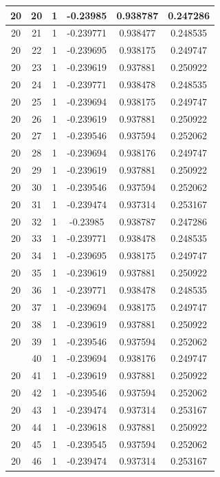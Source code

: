 \documentclass[12pt,a4paper]{article}
\numberwithin{equation}{section}
\numberwithin{figure}{section}
\numberwithin{table}{section}
\begin{document}
\begin{longtable}{|c|c|c|c|c|c|}
20 & 20 & 1 & -0.23985 & 0.938787 & 0.247286 \\ \hline
20 & 21 & 1 & -0.239771 & 0.938477 & 0.248535 \\ \hline
20 & 22 & 1 & -0.239695 & 0.938175 & 0.249747 \\ \hline
20 & 23 & 1 & -0.239619 & 0.937881 & 0.250922 \\ \hline
20 & 24 & 1 & -0.239771 & 0.938478 & 0.248535 \\ \hline
20 & 25 & 1 & -0.239694 & 0.938175 & 0.249747 \\ \hline
20 & 26 & 1 & -0.239619 & 0.937881 & 0.250922 \\ \hline
20 & 27 & 1 & -0.239546 & 0.937594 & 0.252062 \\ \hline
20 & 28 & 1 & -0.239694 & 0.938176 & 0.249747 \\ \hline
20 & 29 & 1 & -0.239619 & 0.937881 & 0.250922 \\ \hline
20 & 30 & 1 & -0.239546 & 0.937594 & 0.252062 \\ \hline
20 & 31 & 1 & -0.239474 & 0.937314 & 0.253167 \\ \hline
20 & 32 & 1 & -0.23985 & 0.938787 & 0.247286 \\ \hline
20 & 33 & 1 & -0.239771 & 0.938478 & 0.248535 \\ \hline
20 & 34 & 1 & -0.239695 & 0.938175 & 0.249747 \\ \hline
20 & 35 & 1 & -0.239619 & 0.937881 & 0.250922 \\ \hline
20 & 36 & 1 & -0.239771 & 0.938478 & 0.248535 \\ \hline
20 & 37 & 1 & -0.239694 & 0.938175 & 0.249747 \\ \hline
20 & 38 & 1 & -0.239619 & 0.937881 & 0.250922 \\ \hline
20 & 39 & 1 & -0.239546 & 0.937594 & 0.252062 \\ \hline
\pagebreak
20 & 40 & 1 & -0.239694 & 0.938176 & 0.249747 \\ \hline
20 & 41 & 1 & -0.239619 & 0.937881 & 0.250922 \\ \hline
20 & 42 & 1 & -0.239546 & 0.937594 & 0.252062 \\ \hline
20 & 43 & 1 & -0.239474 & 0.937314 & 0.253167 \\ \hline
20 & 44 & 1 & -0.239618 & 0.937881 & 0.250922 \\ \hline
20 & 45 & 1 & -0.239545 & 0.937594 & 0.252062 \\ \hline
20 & 46 & 1 & -0.239474 & 0.937314 & 0.253167 \\ \hline

\end{longtable}
\end{document}
